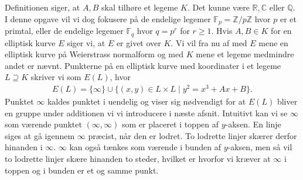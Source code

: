 Definitionen siger, at $A, B$ skal tilhøre et legeme $K$. Det kunne være $\mathbb{R}, \mathbb{C}$ eller $\mathbb{Q}$. I denne opgave vil vi dog fokusere på de endelige legemer $\mathbb{F}_p = \mathbb{Z}/p\mathbb{Z}$ hvor $p$ er et primtal, eller de endelige legemer $\mathbb{F}_q$ hvor $q = p^r$ for $r \geq 1$. Hvis $A, B \in K$ for en elliptisk kurve $E$ siger vi, at $E$ er givet over $K$. Vi vil fra nu af med $E$ mene en elliptisk kurve på Weierstrass normalform og med $K$ mene et legeme medmindre andet er nævnt. Punkterne på en elliptisk kurve med koordinater i et legeme $L \supseteq K$ skriver vi som $E(L)$, hvor 
\begin{align}
\label{elliptic_curve_points}
	E(L) = \{ \infty \} \cup \{ (x, y) \in L \times L \mid y^2 = x^3 + Ax + B \}.
\end{align}
Punktet $\infty$ kaldes punktet i uendelig og viser sig nødvendigt for at $E(L)$ bliver en gruppe under additionen vi vi introducere i næste afsnit. Intuitivt kan vi se $\infty$ som værende punktet $(\infty, \infty)$ som er placeret i toppen af $y$-aksen. En linje siges at gå igennem $\infty$ præcist, når den er lodret. To lodrette linjer skærer derfor hinanden i $\infty$. $\infty$ kan også tænkes som værende i bunden af $y$-aksen, men så vil to lodrette linjer skære hinanden to steder, hvilket er hvorfor vi kræver at $\infty$ i toppen og i bunden er et og samme punkt.


